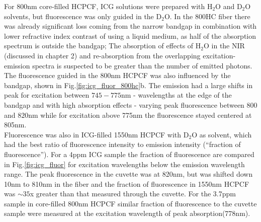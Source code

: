 For 800nm core-filled HCPCF, ICG solutions were prepared with H${}_2$O and  D${}_2$O solvents, but fluorescence was only guided in the D${}_2$O. In the 800HC fiber there was already significant loss coming from the narrow bandgap in combination with lower refractive index contrast of using a liquid medium, as half of the absorption spectrum is outside the bandgap; The absorption of effects of H${}_2$O in the NIR (discussed in chapter 2) and re-absorption from the overlapping excitation-emission spectra is suspected to be greater than the number of emitted photons. The fluorescence guided in the 800nm HCPCF was also influenced by the bandgap, shown in Fig.\ref{fig:icg_fluor_800hc}b. The emission had a large shifts in peak for excitation between $745 - 775$nm - wavelengths at the edge of the bandgap and with high absorption effects - varying peak fluorescence between $800$ and $820$nm while for excitation above 775nm the fluorescence stayed centered at 805nm. \\
Fluorescence was also in ICG-filled 1550nm HCPCF with D${}_2$O as solvent, which had the best ratio of fluorescence intensity to emission intensity (``fraction of fluorescence''). For a 4ppm ICG sample the fraction of fluorescence are compared in Fig.\ref{fig:icg_fluor} for excitation wavelengths below the emission wavelength range.
The peak fluorescence in the cuvette was at 820nm, but was shifted down 10nm to 810nm in the fiber and the fraction of fluorescence in 1550nm HCPCF was $\sim35$x greater than that measured through the cuvette.
For the 3.7ppm sample in core-filled 800nm HCPCF similar fraction of fluorescence to the cuvette sample were measured at the excitation wavelength of peak absorption(778nm).

